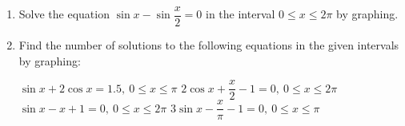 \documentclass{report}
\begin{document}
\begin{enumerate}
	\item Solve the equation $\sin x - \sin \dfrac{x}{2} = 0$ in the interval $0 \leq x \leq 2 \pi$ by graphing.
	          
	\item Find the number of solutions to the following equations in the given intervals by graphing:
	          
	      \begin{tasks}
	      	\task $\sin x + 2 \cos x = 1.5,\ 0 \leq x \leq \pi$
	      	\task $2 \cos x + \dfrac{x}{2} - 1 = 0,\ 0 \leq x \leq 2 \pi$
	      	\task $\sin x - x + 1 = 0,\ 0 \leq x \leq 2 \pi$
	      	\task $3 \sin x - \dfrac{x}{\pi} - 1 = 0,\ 0 \leq x \leq \pi$
	      \end{tasks}
\end{enumerate}
\end{document}
